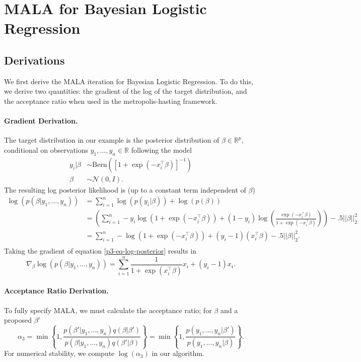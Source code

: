 \documentclass{article}
\begin{document}
\section{MALA for Bayesian Logistic Regression}

\subsection{Derivations}

We first derive the MALA iteration for Bayesian Logistic Regression. 
To do this, we derive two quantities: the gradient of the log of the target distribution, 
and the acceptance ratio when used in the metropolis-hasting framework.

\paragraph{Gradient Derivation.} 
The target distribution in our example is the posterior distribution of $\beta \in \mathbb{R}^p$, conditional
on observations $y_1,...,y_n \in \mathbb{R}$ following the model
\begin{align}
    y_i | \beta &\sim \text{Bern}(\left[ 1 + \exp(-x_i^\intercal \beta) \right]^{-1})\\
    \beta &\sim \mathcal{N}(0, I).
\end{align}
The resulting log posterior likelihood is (up to a constant term independent of $\beta$)
\begin{align} \label{p3-eq-log-posterior}
    \log ( p(\beta | y_1,...,y_n) ) &= \sum_{i=1}^n \log( p(y_i | \beta)) + \log(p(\beta))\\
    &= \left( 
        \sum_{i=1}^n -y_i \log(1+\exp(-x_i^\intercal \beta)) 
        + (1-y_i) \log\left( \frac{\exp(-x_i^\intercal\beta)}{1+\exp(-x_i^\intercal\beta)}\right) 
        \right) - .5 ||\beta||_2^2\\
    &= \sum_{i=1}^n -\log\left( 1+\exp(-x_i^\intercal\beta) \right) + (y_i-1)(x_i^\intercal \beta) - .5 ||\beta||_2^2. \\
\end{align} 
Taking the gradient of equation \ref{p3-eq-log-posterior} results in
\begin{equation}
    \nabla_{\beta} \log( p(\beta | y_1,...,y_n) ) = \sum_{i=1}^n \frac{1}{1 + \exp(x_i^\intercal\beta)} x_i + (y_i - 1) x_i.
\end{equation}

\paragraph{Acceptance Ratio Derivation.} 
To fully specify MALA, we must calculate the acceptance ratio; for $\beta$ and a proposed $\beta'$
\begin{equation} \label{p3-eq-acceptance-ratio}
    \alpha_3
    = \min\left\{1, \frac{p(\beta' | y_1,...,y_n) q(\beta | \beta')}{p(\beta | y_1,...,y_n) q(\beta' | \beta)} \right\} 
    = \min\left\{1, \frac{p(y_1,...,y_n | \beta')}{p(y_1,...,y_n | \beta)}\right\}.
\end{equation}
For numerical stability, we compute $\log(\alpha_3)$ in our algorithm.
\end{document}

